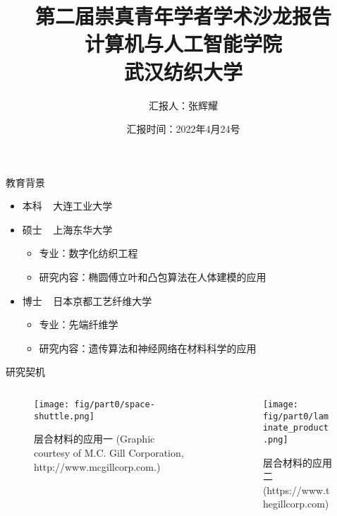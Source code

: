 \documentclass{beamer}
\title{第二届崇真青年学者学术沙龙报告\\
\large 计算机与人工智能学院 \\
\normalsize 武汉纺织大学}
\author{汇报人：张辉耀 }
\date{汇报时间：2022年4月24号}
\begin{document}
\begin{frame}
    \titlepage
\end{frame}

\begin{frame}{教育背景}
	\begin{itemize}
		\item 本科 \textcolor{white}{e} 大连工业大学     
		\item 硕士 \textcolor{white}{e} 上海东华大学       
			\begin{itemize}
				\item 专业：数字化纺织工程
				\item 研究内容：椭圆傅立叶和凸包算法在人体建模的应用 
			\end{itemize}
		\item 博士 \textcolor{white}{e} 日本京都工艺纤维大学 
			\begin{itemize}
				\item 专业：先端纤维学
				\item 研究内容：遗传算法和神经网络在材料科学的应用 
			\end{itemize}
	\end{itemize}
\end{frame}


\begin{frame}{研究契机}
	\begin{columns}
		\begin{column}{0.6\textwidth}
			\begin{figure}
				\texttt{[image: fig/part0/space-shuttle.png]}
				\caption{层合材料的应用一 (Graphic courtesy of M.C. Gill Corporation,
				http://www.mcgillcorp.com.)}
			\end{figure}
		\end{column}
		\begin{column}{0.4\textwidth}
			\begin{figure}
				\texttt{[image: fig/part0/laminate\_product.png]}
				\caption{层合材料的应用二 (https://www.thegillcorp.com)}
			\end{figure}
		\end{column}
	\end{columns}
\end{frame}
\end{document}
